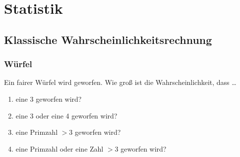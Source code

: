 \documentclass[11pt, a4paper]{article}
\newcommand{\abs}[1]{\left\lvert#1\right\rvert}
\newif\ifshowsolution
\begin{document}
\newpage
\section{Statistik}
\subsection{Klassische Wahrscheinlichkeitsrechnung}
\subsubsection{Würfel}
Ein fairer Würfel wird geworfen. Wie groß ist die Wahrscheinlichkeit, dass \dots \\

\begin{enumerate}
	\item eine 3 geworfen wird?
	
	\ifshowsolution
		Ereignisraum $\Omega = \{1,2,3,4,5,6\}, \quad \abs{\Omega} = 6$ \\
		$\abs{\{3\}} = 1 \rightarrow P(3) = \frac{1}{6}$
	\fi
	
	\item eine 3 oder eine 4 geworfen wird?
	
	\ifshowsolution
		Ereignisraum $\Omega = \{1,2,3,4,5,6\}, \quad \abs{\Omega} = 6$ \\
		$\abs{\{3, 4\}} = 2 \rightarrow P(3 \cup 4) = \frac{2}{6}$
	\fi
	
	\item eine Primzahl $> 3$ geworfen wird?
	
	\ifshowsolution
		Ereignisraum $\Omega = \{1,2,3,4,5,6\}, \quad \abs{\Omega} = 6$ \\
		$\abs{\{5\}} = 1 \rightarrow P(\text{Primzahl} > 3) = \frac{1}{6}$
	\fi
	
	\item eine Primzahl oder eine Zahl $> 3$ geworfen wird?
	
	\ifshowsolution
		Ereignisraum $\Omega = \{1,2,3,4,5,6\}, \quad \abs{\Omega} = 6$ \\
		Primzahlen: $\{2,3,5\}$, $\quad$ Zahlen $> 3: \{4,5,6\}$ \\
		Vereinigung: $\{2,3,5\} \cup \{4,5,6\} = \{2,3,4,5,6\}$ \\
		$\abs{\{2,3,4,5,6\}} = 5 \rightarrow P(\text{'prim' oder} >3) = \frac{5}{6}$
	\fi
\end{enumerate}
\end{document}
